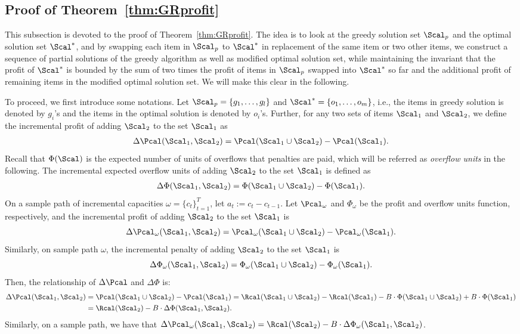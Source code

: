 \subsection{Proof of Theorem~\ref{thm:GRprofit}}\label{appc-unit}

This subsection is devoted to the proof of Theorem~\ref{thm:GRprofit}.
The idea is to look at the greedy solution set $\Scal_p$ and the optimal solution set $\Scal^*$, and by swapping each item in $\Scal_p$ to $\Scal^*$ in replacement of the same item or two other items, we construct a sequence of partial solutions of the greedy algorithm as well as modified optimal solution set, while maintaining the invariant that the profit of $\Scal^*$ is bounded by the sum of two times the profit of items in $\Scal_p$ swapped into $\Scal^*$ so far and the additional profit of remaining items in the modified optimal solution set. We will make this clear in the following. %

To proceed, we first introduce some notations. Let $\Scal_p = \{g_1,\ldots,g_l\}$ and $\Scal^*=\{o_1,\ldots,o_m\}$, i.e., the items in greedy solution is denoted by $g_i$'s and the items in the optimal solution is denoted by $o_i$'s. Further, for any two sets of items $\Scal_1$ and $\Scal_2$, we define the incremental profit of adding $\Scal_2$ to the set $\Scal_1$ as
\begin{align}
\Delta \Pcal(\Scal_1,\Scal_2) = \Pcal(\Scal_1\cup\Scal_2) - \Pcal(\Scal_1).
\end{align}
Recall that $\Phi(\Scal)$ is the expected number of units of overflows that penalties are paid, which will be referred as \emph{overflow units} in the following. The incremental expected overflow units of adding $\Scal_2$ to the set $\Scal_1$ is defined as
\begin{align}
\Delta\Phi(\Scal_1,\Scal_2) = \Phi(\Scal_1\cup\Scal_2) - \Phi(\Scal_1).
\end{align}
On a sample path of incremental capacities $\omega = \{c_t\}_{t=1}^T$, let $a_t := c_t - c_{t-1}$. Let $\Pcal_\omega$ and $\Phi_\omega$ be the profit and overflow units function, respectively, and the incremental profit of adding $\Scal_2$ to the set $\Scal_1$ is $$\Delta\Pcal_\omega(\Scal_1,\Scal_2) = \Pcal_\omega(\Scal_1\cup\Scal_2) - \Pcal_\omega(\Scal_1).$$
Similarly, on sample path $\omega$, the incremental penalty of adding $\Scal_2$ to the set $\Scal_1$ is $$\Delta\Phi_\omega(\Scal_1,\Scal_2) = \Phi_\omega(\Scal_1\cup\Scal_2) - \Phi_\omega(\Scal_1).$$
Then, the relationship of $\Delta\Pcal$ and $\Delta\Phi$ is:
\begin{align*}
\Delta\Pcal(\Scal_1,\Scal_2) &= \Pcal(\Scal_1\cup\Scal_2) - \Pcal(\Scal_1) = \Rcal(\Scal_1\cup\Scal_2) - \Rcal(\Scal_1) - B\cdot\Phi(\Scal_1\cup\Scal_2) + B\cdot\Phi(\Scal_1)\\
&= \Rcal(\Scal_2) - B\cdot \Delta\Phi(\Scal_1,\Scal_2).
\end{align*}
Similarly, on a sample path, we have that $\Delta\Pcal_\omega(\Scal_1,\Scal_2) = \Rcal(\Scal_2) - B\cdot \Delta\Phi_\omega(\Scal_1,\Scal_2)$.

